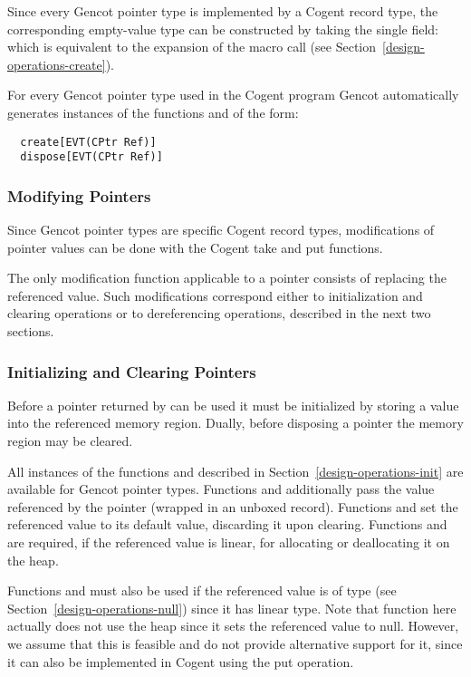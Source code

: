 Since every Gencot pointer type is implemented by a Cogent record type, the corresponding empty-value type can be constructed by 
taking the single field:  which is equivalent to the expansion of the macro call 
(see Section~\ref{design-operations-create}).

For every Gencot pointer type  used in the Cogent program Gencot automatically
generates instances of the functions  and  of the form:
\begin{verbatim}
  create[EVT(CPtr Ref)]
  dispose[EVT(CPtr Ref)]
\end{verbatim}

\subsubsection{Modifying Pointers}

Since Gencot pointer types are specific Cogent record types, modifications of pointer values can be done with the Cogent take and 
put functions.

The only modification function applicable to a pointer consists of replacing the referenced value. Such modifications correspond
either to initialization and clearing operations or to dereferencing operations, described in the next two sections.

\subsubsection{Initializing and Clearing Pointers}

Before a pointer returned by  can be used it must be initialized by storing a value into the referenced memory region.
Dually, before disposing a pointer the memory region may be cleared.

All instances of the functions  and  described in 
Section~\ref{design-operations-init} are available
for Gencot pointer types. Functions  and  additionally pass the value referenced
by the pointer (wrapped in an unboxed record). Functions  and  set the referenced
value to its default value, discarding it upon clearing. Functions  and  
are required, if the referenced value is linear, for allocating or deallocating it on the heap. 

Functions
 and  must also be used if the referenced value is of type  
(see Section~\ref{design-operations-null}) since it has linear type. Note that function  here
actually does not use the heap since it sets the referenced value to null. However, we assume that this is
feasible and do not provide alternative support for it, since it can also be implemented in Cogent using
the put operation.

